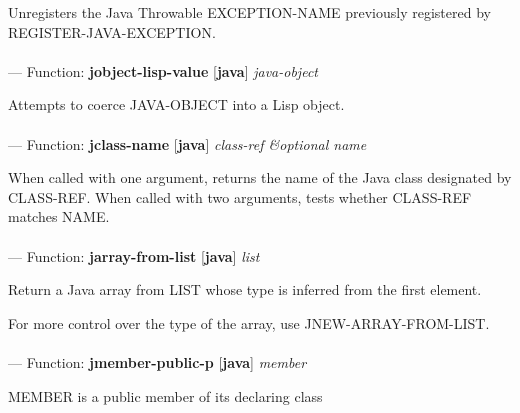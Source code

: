 \begin{adjustwidth}{5em}{5em}
Unregisters the Java Throwable EXCEPTION-NAME previously registered by REGISTER-JAVA-EXCEPTION.
\end{adjustwidth}

\paragraph{}
\label{JAVA:JOBJECT-LISP-VALUE}
--- Function: \textbf{jobject-lisp-value} [\textbf{java}] \textit{java-object}

\begin{adjustwidth}{5em}{5em}
Attempts to coerce JAVA-OBJECT into a Lisp object.
\end{adjustwidth}

\paragraph{}
\label{JAVA:JCLASS-NAME}
--- Function: \textbf{jclass-name} [\textbf{java}] \textit{class-ref \&optional name}

\begin{adjustwidth}{5em}{5em}
When called with one argument, returns the name of the Java class
  designated by CLASS-REF. When called with two arguments, tests
  whether CLASS-REF matches NAME.
\end{adjustwidth}

\paragraph{}
\label{JAVA:JARRAY-FROM-LIST}
--- Function: \textbf{jarray-from-list} [\textbf{java}] \textit{list}

\begin{adjustwidth}{5em}{5em}
Return a Java array from LIST whose type is inferred from the first element.

For more control over the type of the array, use JNEW-ARRAY-FROM-LIST.
\end{adjustwidth}

\paragraph{}
\label{JAVA:JMEMBER-PUBLIC-P}
--- Function: \textbf{jmember-public-p} [\textbf{java}] \textit{member}

\begin{adjustwidth}{5em}{5em}
MEMBER is a public member of its declaring class
\end{adjustwidth}


